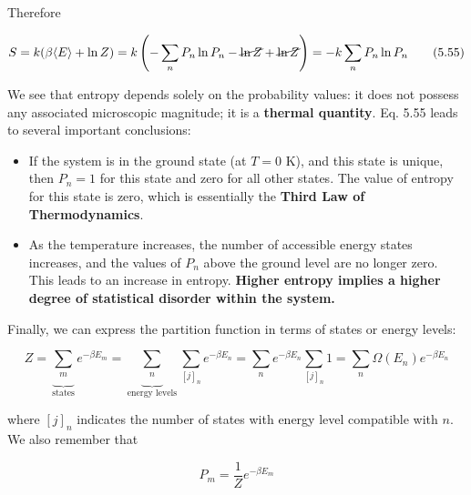\documentclass[12pt,a4paper]{report}
\newcommand{\esp}{\vspace{0.5cm}}
\begin{document}
\esp

Therefore

\esp

\begin{equation}
	S = k(\beta \langle E \rangle + \ln Z) = k \left( -\sum_n P_n \ln P_n - \cancel{\ln Z} + \cancel{\ln Z} \right) = -k \sum_n P_n \ln P_n \tag{5.55}
\end{equation}

\esp

We see that entropy depends solely on the probability values: it does not possess any associated microscopic magnitude; it is a \textbf{thermal quantity}. Eq. 5.55 leads to several important conclusions:

\esp

\begin{itemize}
	\item If the system is in the ground state (at $T = 0$ K), and this state is unique, then $P_n = 1$ for this state and zero for all other states. The value of entropy for this state is zero, which is essentially the \textbf{Third Law of Thermodynamics}.
	\item As the temperature increases, the number of accessible energy states increases, and the values of $P_n$ above the ground level are no longer zero. This leads to an increase in entropy. \textbf{Higher entropy implies a higher degree of statistical disorder within the system.}
\end{itemize}

\esp

Finally, we can express the partition function in terms of states or energy levels:

\esp

\begin{equation}
	Z = \underbrace{\sum_m}_{\text{states}} e^{-\beta E_m} = \underbrace{\sum_n}_{\text{energy levels}} \sum_{[j]_n} e^{-\beta E_n} = \sum_n e^{-\beta E_n} \sum_{[j]_n} 1 = \sum_n \Omega(E_n) e^{-\beta E_n} \tag{5.56}
\end{equation}

\esp

where $[j]_n$ indicates the number of states with energy level compatible with $n$. We also remember that

\esp

\begin{equation}
	P_m = \frac{1}{Z} e^{-\beta E_m} \tag{5.57}
\end{equation}

\esp
\end{document}
